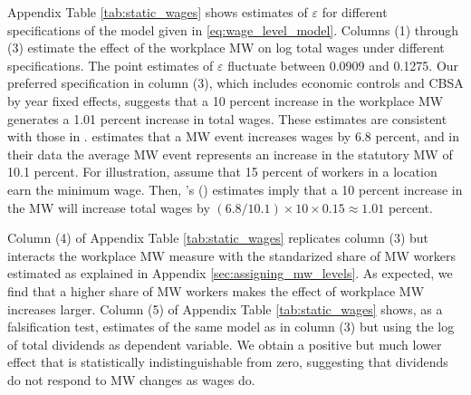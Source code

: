 Appendix Table \ref{tab:static_wages} shows estimates of $\varepsilon$ for 
different specifications of the model given in \eqref{eq:wage_level_model}.
Columns (1) through (3) estimate the effect of the workplace MW on log total
wages under different specifications.
The point estimates of $\varepsilon$ fluctuate between 0.0909 and 0.1275.
Our preferred specification in column (3), which includes
economic controls and CBSA by year fixed effects, suggests that a 10 percent 
increase in the workplace MW generates a 1.01 percent increase in total wages.
These estimates are consistent with those in \textcite{CegnizEtAl2019}.
\textcite[][Table I]{CegnizEtAl2019} estimates that a MW event increases wages
by 6.8 percent, and in their data the average MW event represents an increase in 
the statutory MW of 10.1 percent.
For illustration, assume that 15 percent of workers in a location earn the
minimum wage.
Then, \citeauthor{CegnizEtAl2019}'s (\citeyear{CegnizEtAl2019}) estimates imply 
that a 10 percent increase in the MW will increase total wages by 
$(6.8/10.1)\times 10\times 0.15 \approx 1.01$ percent.

Column (4) of Appendix Table \ref{tab:static_wages} replicates column (3)
but interacts the workplace MW measure with the standarized share of MW workers
estimated as explained in Appendix \ref{sec:assigning_mw_levels}.
As expected, we find that a higher share of MW workers makes the effect of
workplace MW increases larger.
Column (5) of Appendix Table \ref{tab:static_wages} shows, as a falsification
test, estimates of the same model as in column (3) but using the log of total
dividends as dependent variable.
We obtain a positive but much lower effect that is statistically 
indistinguishable from zero, suggesting that dividends do not respond to 
MW changes as wages do.
